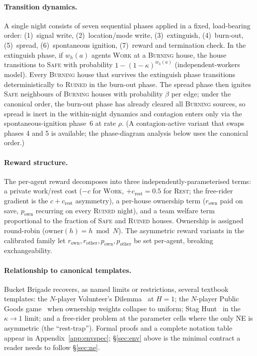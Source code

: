 \documentclass{anvil-paper}
\begin{document}
\paragraph{Transition dynamics.}
A single night consists of seven sequential phases applied in a fixed,
load-bearing order: (1)~signal write, (2)~location/mode write,
(3)~extinguish, (4)~burn-out, (5)~spread, (6)~spontaneous ignition,
(7)~reward and termination check. In the extinguish phase, if $w_h(a)$
agents \textsc{Work} at a \textsc{Burning} house, the house transitions to
\textsc{Safe} with probability $1-(1-\kappa)^{w_h(a)}$ (independent-workers
model). Every \textsc{Burning} house that survives the extinguish phase
transitions deterministically to \textsc{Ruined} in the burn-out phase. The
spread phase then ignites \textsc{Safe} neighbours of \textsc{Burning}
houses with probability $\beta$ per edge; under the canonical order, the
burn-out phase has already cleared all \textsc{Burning} sources, so spread is
inert in the within-night dynamics and contagion enters only via the
spontaneous-ignition phase~6 at rate $\rho$. (A contagion-active variant
that swaps phases 4 and 5 is available; the phase-diagram analysis below
uses the canonical order.)

\paragraph{Reward structure.}
The per-agent reward decomposes into three independently-parameterised terms:
a private work/rest cost ($-c$ for \textsc{Work}, $+c_{\text{rest}}{=}0.5$
for \textsc{Rest}; the free-rider gradient is the $c{+}c_{\text{rest}}$
asymmetry), a per-house ownership term ($r_{\text{own}}$ paid on save,
$p_{\text{own}}$ recurring on every \textsc{Ruined} night), and a team
welfare term proportional to the fraction of \textsc{Safe} and
\textsc{Ruined} houses. Ownership is assigned round-robin
($\text{owner}(h){=}h\bmod N$). The asymmetric reward variants in the
calibrated family let $r_{\text{own}},r_{\text{other}},p_{\text{own}},
p_{\text{other}}$ be set per-agent, breaking exchangeability.

\paragraph{Relationship to canonical templates.}
Bucket Brigade recovers, as named limits or restrictions, several textbook
templates: the $N$-player Volunteer's
Dilemma~\citep{diekmann1985volunteer} at $H{=}1$; the $N$-player
Public Goods game~\citep{ledyard1995public} when ownership weights
collapse to uniform; Stag Hunt~\citep{skyrms2003stag} in
the $\kappa{\to}1$ limit; and a free-rider problem at the parameter cells
where the only NE is asymmetric (the ``rest-trap''). Formal proofs and a
complete notation table appear in Appendix~\ref{app:envspec};
\S\ref{sec:env} above is the minimal contract a reader needs to follow
\S\ref{sec:ne}.
\end{document}
